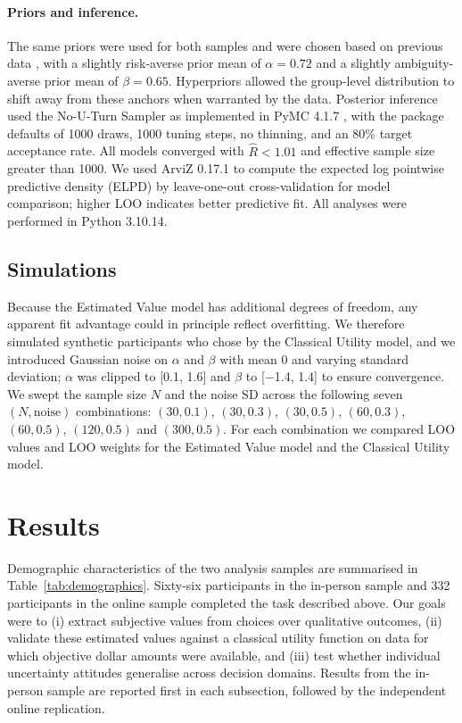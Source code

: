 \documentclass[11pt]{article}
\begin{document}
\paragraph{Priors and inference.} The same priors were used for both samples and were chosen based on previous data \citep{levy2012measuring}, with a slightly risk-averse prior mean of $\alpha = 0.72$ and a slightly ambiguity-averse prior mean of $\beta = 0.65$. Hyperpriors allowed the group-level distribution to shift away from these anchors when warranted by the data. Posterior inference used the No-U-Turn Sampler \citep{hoffman2014nuts} as implemented in PyMC 4.1.7 \citep{salvatier2016pymc3}, with the package defaults of 1000 draws, 1000 tuning steps, no thinning, and an 80\% target acceptance rate. All models converged with $\hat{R} < 1.01$ and effective sample size greater than 1000. We used ArviZ 0.17.1 \citep{kumar2019arviz} to compute the expected log pointwise predictive density (ELPD) by leave-one-out cross-validation \citep{vehtari2017loo} for model comparison; higher LOO indicates better predictive fit. All analyses were performed in Python 3.10.14.

\subsection{Simulations}

Because the Estimated Value model has additional degrees of freedom, any apparent fit advantage could in principle reflect overfitting. We therefore simulated synthetic participants who chose by the Classical Utility model, and we introduced Gaussian noise on $\alpha$ and $\beta$ with mean 0 and varying standard deviation; $\alpha$ was clipped to [0.1, 1.6] and $\beta$ to [$-$1.4, 1.4] to ensure convergence. We swept the sample size $N$ and the noise SD across the following seven $(N, \text{noise})$ combinations: $(30, 0.1)$, $(30, 0.3)$, $(30, 0.5)$, $(60, 0.3)$, $(60, 0.5)$, $(120, 0.5)$ and $(300, 0.5)$. For each combination we compared LOO values and LOO weights for the Estimated Value model and the Classical Utility model.

\section{Results}

Demographic characteristics of the two analysis samples are summarised in Table~\ref{tab:demographics}. Sixty-six participants in the in-person sample and 332 participants in the online sample completed the task described above. Our goals were to (i) extract subjective values from choices over qualitative outcomes, (ii) validate these estimated values against a classical utility function on data for which objective dollar amounts were available, and (iii) test whether individual uncertainty attitudes generalise across decision domains. Results from the in-person sample are reported first in each subsection, followed by the independent online replication.
\end{document}

